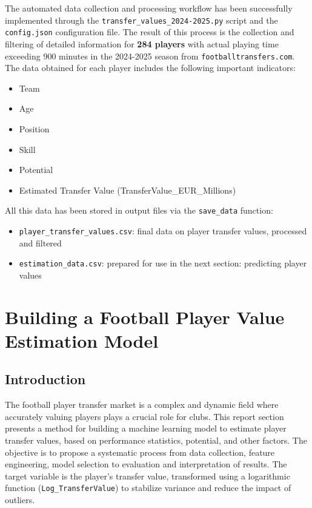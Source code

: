 \documentclass[12pt, a4paper]{report}
\begin{document}
The automated data collection and processing workflow has been successfully implemented through the \texttt{transfer\_values\_2024-2025.py} script and the \texttt{config.json} configuration file.
The result of this process is the collection and filtering of detailed information for \textbf{284 players} with actual playing time exceeding 900 minutes in the 2024-2025 season from \texttt{footballtransfers.com}.
The data obtained for each player includes the following important indicators:
\begin{itemize}
    \item Team
    \item Age
    \item Position
    \item Skill
    \item Potential
    \item Estimated Transfer Value (TransferValue\_EUR\_Millions)
\end{itemize}
All this data has been stored in output files via the \texttt{save\_data} function:
\begin{itemize}
    \item \texttt{player\_transfer\_values.csv}: final data on player transfer values, processed and filtered
    \item \texttt{estimation\_data.csv}: prepared for use in the next section: predicting player values
\end{itemize}

\section{Building a Football Player Value Estimation Model}

\subsection{Introduction}
The football player transfer market is a complex and dynamic field where accurately valuing players plays a crucial role for clubs.
This report section presents a method for building a machine learning model to estimate player transfer values, based on performance statistics, potential, and other factors.
The objective is to propose a systematic process from data collection, feature engineering, model selection to evaluation and interpretation of results.
The target variable is the player's transfer value, transformed using a logarithmic function (\texttt{Log\_TransferValue}) to stabilize variance and reduce the impact of outliers.
\end{document}
